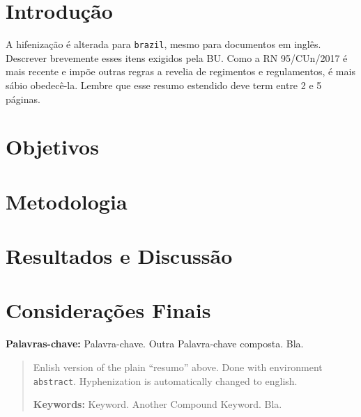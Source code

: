 \documentclass[embeddedlogo]{ufsc-thesis-rn46-2019}
\begin{document}
\begin{resumo}
  \section*{Introdução} 
  A hifenização é alterada para \texttt{brazil}, mesmo para documentos em inglês. Descrever brevemente esses itens exigidos pela BU. Como a RN 95/CUn/2017 é mais recente e impõe outras regras a revelia de regimentos e regulamentos, é mais sábio obedecê-la. Lembre que esse resumo estendido deve term entre 2 e 5 páginas.
  
  \lipsum[1]
  \section*{Objetivos} 
  \lipsum[2]
  \section*{Metodologia} 
  \lipsum[3]
  \section*{Resultados e Discussão} 
  \lipsum[4]
  \section*{Considerações Finais} 
  \lipsum[5]

  \vspace{\baselineskip}  %
  \textbf{Palavras-chave:} Palavra-chave. Outra Palavra-chave composta. Bla.
\end{resumo}


\begin{abstract}
  Enlish version of the plain ``resumo'' above. Done with environment
  \texttt{abstract}. Hyphenization is automatically changed to english.

  \vspace{\baselineskip} 
  \textbf{Keywords:} Keyword. Another Compound Keyword. Bla.
\end{abstract}

\listoffigures*  %
\end{document}
